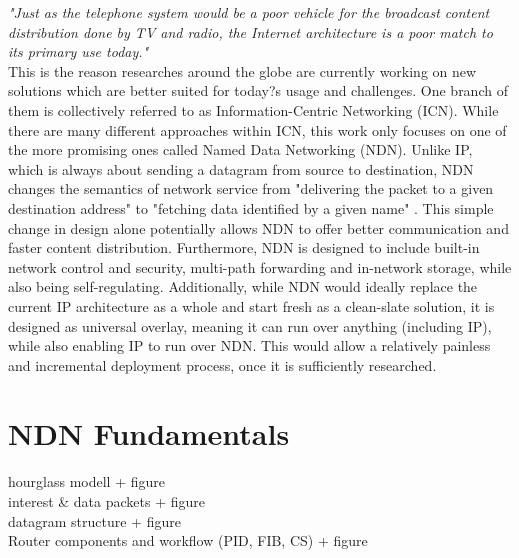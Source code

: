 \textit{ "Just as the telephone system would be a poor vehicle for the broadcast content distribution done by TV and radio, the Internet architecture is a poor match to its primary use today."} \\

This is the reason researches around the globe are currently working on new solutions which are better suited for today?s usage and challenges. One branch of them is collectively referred to as Information-Centric Networking (ICN). While there are many different approaches within ICN, this work only focuses on one of the more promising ones called Named Data Networking (NDN). Unlike IP, which is always about sending a datagram from source to destination, NDN changes the semantics of network service from "delivering the packet to a given destination address" to "fetching data identified by a given name" \cite{ZABJ14}. This simple change in design alone potentially allows NDN to offer better communication and faster content distribution. Furthermore, NDN is designed to include built-in network control and security, multi-path forwarding and in-network storage, while also being self-regulating. Additionally, while NDN would ideally replace the current IP architecture as a whole and start fresh as a clean-slate solution, it is designed as universal overlay, meaning it can run over anything (including IP), while also enabling IP to run over NDN. This would allow a relatively painless and incremental deployment process, once it is sufficiently researched. \cite{ZEBJ10, ZABJ14}

\section{NDN Fundamentals}
hourglass modell + figure \\
interest \& data packets + figure \\
datagram structure + figure \\
Router components and workflow (PID, FIB, CS) + figure \\

